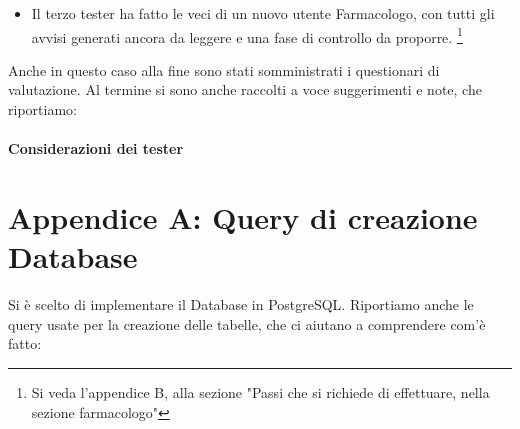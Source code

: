 \documentclass[11pt]{article}
\begin{document}
            \begin{itemize}
                \item Il terzo tester ha fatto le veci di un nuovo utente Farmacologo, con tutti gli avvisi generati ancora da leggere e una fase di controllo da proporre. \footnote{Si veda l'appendice B, alla sezione "Passi che si richiede di effettuare, nella sezione farmacologo"}
            \end{itemize}
        Anche in questo caso alla fine sono stati somministrati i questionari di valutazione.
    Al termine si sono anche raccolti a voce suggerimenti e note, che riportiamo: 
    \paragraph*{Considerazioni dei tester}
\newpage
    \section*{Appendice A: Query di creazione Database}

    Si è scelto di implementare il Database in PostgreSQL. Riportiamo anche le query usate per la creazione delle tabelle, che ci aiutano a comprendere com'è fatto:
\end{document}
